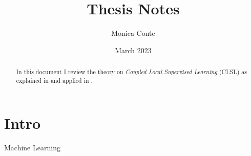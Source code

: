 \documentclass{article}
\title{Thesis Notes}
\author{Monica Conte}
\date{March 2023}
\begin{document}


\maketitle

\renewcommand{\abstractname}{}
\begin{abstract}
    In this document I review the theory on \textit{Coupled Local Supervised Learning} (CLSL) as explained in \cite{} and applied in \cite{}.
\end{abstract}

\tableofcontents


\newpage

\section{Intro}


Machine Learning
\end{document}
